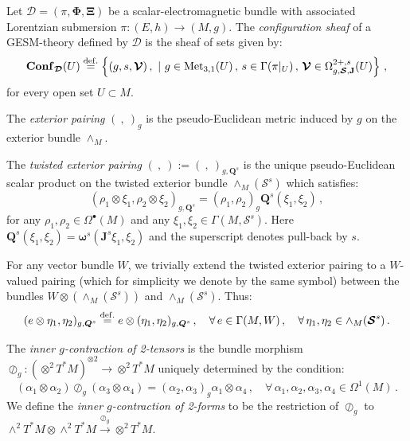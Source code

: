 \documentclass[10pt, cmp, numbook, final, a4paper]{svjour}
\newcommand{\eqdef}{\stackrel{{\rm def.}}{=}}
\def\bcD{\boldsymbol{\mathcal{D}}}
\def\bJ{\mathbf{J}}
\def\bomega{\boldsymbol{\omega}}
\def\bJ{\mathbf{J}}
\newcommand{\be}{\begin{equation*}}
\newcommand{\ee}{\end{equation*}}
\def\bXi{{\boldsymbol{\Xi}}}
\def\cV{\mathcal{V}}
\def\bPhi{\mathbf{\Phi}}
\def\bConf{\mathbf{Conf}}
\def\bQ{\boldsymbol{Q}}
\def\bomega{\boldsymbol{\omega}}
\def\Met{\mathrm{Met}}
\def\bcS{\boldsymbol{\mathcal{S}}}
\def\bcV{\boldsymbol{\cV}}
\begin{document}
\begin{definition}
Let $\bcD = (\pi,\bPhi,\bXi)$ be a scalar-electromagnetic bundle with
associated Lorentzian submersion $\pi\colon (E,h)\to (M,g)$. The {\em
  configuration sheaf} of a GESM-theory defined by $\bcD$ is the sheaf
of sets given by:
\be
\bConf_{\bcD}(U)\eqdef \left\{ (g,s,\bcV)\, , \,\, |\,\, g\in\Met_{3,1}(U)\, , \,   s\in \Gamma(\pi|_{U}) \, , \, \bcV\in \Omega^{2+,s}_{g,\bcS,\bJ}(U) \right\}\, ,
\ee
for every open set $U\subset M$.
\end{definition}

\noindent
The {\em exterior pairing} $(~,~)_g$ is the pseudo-Euclidean metric
induced by $g$ on the exterior bundle $\wedge_M$.

\begin{definition}
\label{def:tep}
The {\em twisted exterior pairing} $(~,~):=(~,~)_{g,\bQ^{s}}$ is the
unique pseudo-Euclidean scalar product on the twisted exterior bundle
$\wedge_M(\bcS^{s})$ which satisfies:
\begin{equation*}
(\rho_1\otimes \xi_1,\rho_2\otimes \xi_2)_{g,\bQ^{s}}=(\rho_1,\rho_2)_g \bQ^{s}(\xi_1,\xi_2)\, ,
\end{equation*}
for any $\rho_1,\rho_2\in \Omega^{\bullet}(M)$ and any
$\xi_1,\xi_2\in \Gamma(M,\bcS^{s})$. Here $\bQ^{s}(\xi_1,\xi_2)
= \bomega^{s}(\bJ^{s} \xi_1,\xi_2)$ and the superscript denotes pull-back by
$s$.
\end{definition}

\noindent For any vector bundle $W$, we trivially extend the twisted
exterior pairing to a $W$-valued pairing (which for simplicity we
denote by the same symbol) between the bundles $W\otimes
(\wedge_M(\bcS^{s}))$ and $\wedge_M(\bcS^{s})$. Thus:
\be
(e \otimes \eta_1,\eta_2)_{g,\bQ^{s}} \eqdef  e \otimes (\eta_1,\eta_2)_{g,\bQ^{s}}\, , \quad\forall\, e\in \Gamma(M,W)\, , \quad \forall\, \eta_1,\eta_2\in \wedge_M(\bcS^{s})\, .
\ee

\noindent 
The {\em inner $g$-contraction of 2-tensors} is the bundle morphism
$\oslash_g:(\otimes^2T^\ast M)^{\otimes 2}\rightarrow\otimes^2 T^\ast
M$ uniquely determined by the condition:
\begin{equation*}
(\alpha_1\otimes\alpha_2)\oslash_g (\alpha_3\otimes \alpha_4)=(\alpha_2,\alpha_3)_g\alpha_1\otimes \alpha_4\, , \quad \forall\, \alpha_1, \alpha_2, \alpha_3, \alpha_4\in \Omega^1(M)\, .
\end{equation*}
We define the \emph{inner $g$-contraction of 2-forms} to be the
restriction of $\oslash_g$ to $\wedge^2 T^\ast M \otimes \wedge^2
T^\ast M\stackrel{\oslash_g}{\rightarrow} \otimes^2 T^\ast M$.
\end{document}
